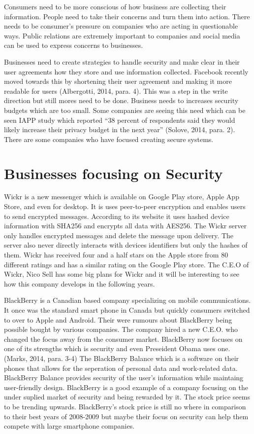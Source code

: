 \documentclass[12pt]{article}
\begin{document}
Consumers need to be more conscious of how business are collecting their information. People need to take their concerns and turn them into action. There needs to be consumer's pressure on companies who are acting in questionable ways. Public relations are extremely important to companies and social media can be used to express concerns to businesses. 

Businesses need to create strategies to handle security and make clear in their user agreements how they store and use information collected. Facebook recently moved towards this by shortening their user agreement and making it more readable for users (Albergotti, 2014, para. 4). This was a step in the write direction but still mores need to be done. Business needs to increases security budgets which are too small. Some companies are seeing this need which can be seen  IAPP study which reported ``38 percent of respondents said they would likely increase their privacy budget in the next year'' (Solove, 2014, para. 2). There are some companies who have focused creating secure systems.

\section{Businesses focusing on Security}\label{sec:real-life}
Wickr is a new messenger which is available on Google Play store, Apple App Store, and even for desktop. It is uses peer-to-peer encryption and enables users to send encrypted messages.  According to its website it uses hashed device information with SHA256 and encrypts all data with AES256. The Wickr server only handles encrypted messages and delete the message upon delivery. The server also never directly interacts with devices identifiers but only the hashes of them. Wickr has received four and a half stars on the Apple store from 80 different ratings and has a similar rating on the Google Play store. The C.E.O of Wickr, Nico Sell has some big plans for Wickr and it will be interesting to see how this company develops in the following years.

BlackBerry is a Canadian based company specializing on mobile communications. It once was the standard smart phone in Canada but quickly consumers switched to over to Apple and Android. Their were rumours about BlackBerry being possible bought by various companies. The company hired a new C.E.O. who changed the focus away from the consumer market. BlackBerry now focuses on one of its strengths which is security and even Preseident Obama uses one.(Marks, 2014, para. 3-4) The BlackBerry Balance which is a software on their phones that allows for the seperation of personal data and work-related data. BlackBerry Balance provides security of the user's information while maintaing user-friendly design. BlackBerry is a good example of a company focusing on the under suplied market of security and being rewarded by it. The stock price seems to be trending upwards. BlackBerry's stock price is still no where in comparison to their best years of 2008-2009 but maybe their focus on security can help them compete with large smartphone companies.
\end{document}
